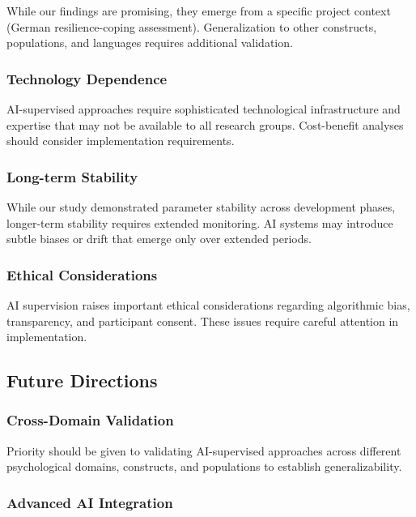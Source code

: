 \documentclass[12pt,a4paper]{article}
\begin{document}
While our findings are promising, they emerge from a specific project context (German resilience-coping assessment). Generalization to other constructs, populations, and languages requires additional validation.

\subsubsection{Technology Dependence}

AI-supervised approaches require sophisticated technological infrastructure and expertise that may not be available to all research groups. Cost-benefit analyses should consider implementation requirements.

\subsubsection{Long-term Stability}

While our study demonstrated parameter stability across development phases, longer-term stability requires extended monitoring. AI systems may introduce subtle biases or drift that emerge only over extended periods.

\subsubsection{Ethical Considerations}

AI supervision raises important ethical considerations regarding algorithmic bias, transparency, and participant consent. These issues require careful attention in implementation.

\subsection{Future Directions}

\subsubsection{Cross-Domain Validation}

Priority should be given to validating AI-supervised approaches across different psychological domains, constructs, and populations to establish generalizability.

\subsubsection{Advanced AI Integration}
\end{document}
